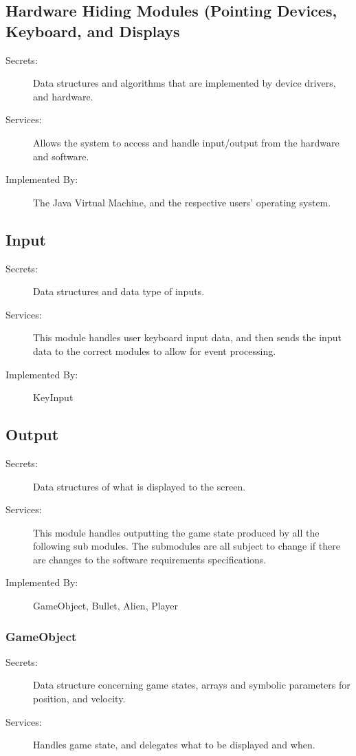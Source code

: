 \documentclass[12pt, titlepage]{article}
\begin{document}
\subsection{Hardware Hiding Modules (Pointing Devices, Keyboard, and Displays}
\begin{description}
\item[Secrets:] Data structures and algorithms that are implemented by device drivers, and hardware.
\item[Services:] Allows the system to access and handle input/output from the hardware and software.
\item[Implemented By:] The Java Virtual Machine, and the respective users' operating system.
\end{description}

\subsection{Input}
\begin{description}
\item[Secrets:] Data structures and data type of inputs.
\item[Services:] This module handles user keyboard input data, and then sends the input data to the correct modules to allow for event processing.
\item[Implemented By:] KeyInput
\end{description}

\subsection{Output}
\begin{description}
\item[Secrets:] Data structures of what is displayed to the screen.
\item[Services:] This module handles outputting the game state produced by all the following sub modules. The submodules are all subject to change if there are changes to the software requirements specifications.
\item[Implemented By:] GameObject, Bullet, Alien, Player
\end{description}

\subsubsection{GameObject}
\begin{description}
\item[Secrets:] Data structure concerning game states, arrays and symbolic parameters for position, and velocity.
\item[Services:] Handles game state, and delegates what to be displayed and when.
\end{description}
\end{document}
